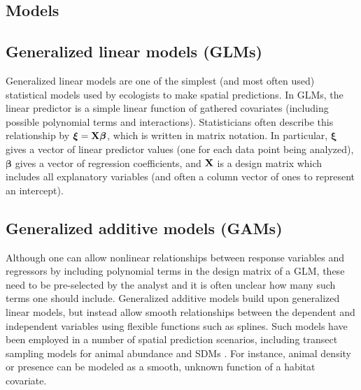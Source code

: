 \documentclass[12pt,fleqn]{article}
\begin{document}
\begin{flushleft}
\section{Models}
\subsection{Generalized linear models (GLMs)}

Generalized linear models \citep{McCullaghNelder1989} are one of the simplest (and most often used) statistical models
used by ecologists to make spatial predictions. In GLMs, the linear predictor is a simple linear function of gathered covariates
(including possible polynomial terms and interactions).  Statisticians often describe this relationship by
$\boldsymbol{\xi}={\bf X} \boldsymbol{\beta}$, which is written in matrix notation.  In particular, $\boldsymbol{\xi}$ gives
a vector of linear predictor values (one for each data point being analyzed), $\boldsymbol{\beta}$ gives a vector of regression coefficients, and ${\bf X}$ is a design matrix which includes all explanatory variables (and often a column vector of ones to represent an intercept).

\subsection{Generalized additive models (GAMs)}

Although one can allow nonlinear relationships between response variables and regressors by including polynomial terms in the design matrix of a GLM, these need to be pre-selected by the analyst and it is often unclear how many such terms one should include. Generalized additive models \citep[GAMs;][]{HastieTibshirani1999,Wood2006} build upon generalized linear models, but instead allow smooth relationships between the dependent and independent variables using flexible functions such as splines.  Such models have
been employed in a number of spatial prediction scenarios, including transect sampling models for animal abundance \citep{HedleyBuckland2004} and SDMs \citep{GuisanEtAl2002}.  For instance, animal density or presence can be modeled as a smooth, unknown function of a habitat covariate.


\end{flushleft}
\end{document}
